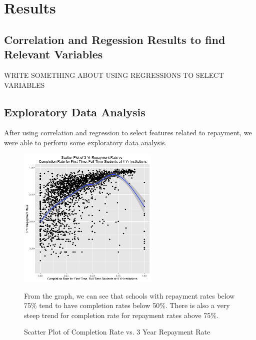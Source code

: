 \section{Results}

\subsection{Correlation and Regession Results to find Relevant Variables}
WRITE SOMETHING ABOUT USING REGRESSIONS TO SELECT VARIABLES 


\subsection{Exploratory Data Analysis}
After using correlation and regression to select features related to repayment, we were able to perform some exploratory data analysis. 

\begin{figure}
  \caption{Scatter Plot of Completion Rate vs. 3 Year Repayment Rate}
  \centering
  \includegraphics[width=0.6\textwidth]{../images/eda/complrt_rpy3yr_scatter.png}
  \centering
  \newline
  
  \raggedright
From the graph, we can see that schools with repayment rates below 75\% tend to have completion rates below 50\%. There is also a very steep trend for completion rate for repayment rates above 75\%. 
\end{figure}
 


